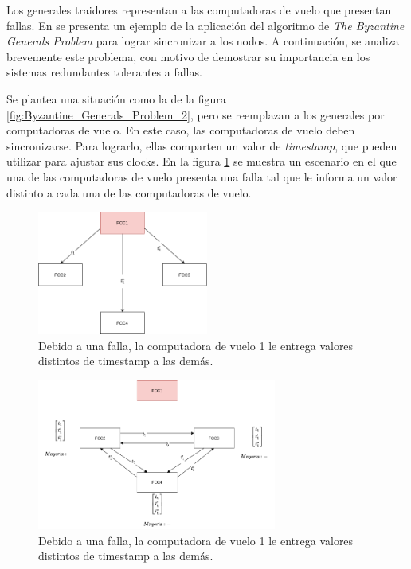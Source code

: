 Los generales traidores representan a las computadoras de vuelo que presentan fallas. En \cite{wensley1978sift} se presenta un ejemplo de la aplicación del algoritmo de \textit{The Byzantine Generals Problem} para lograr sincronizar a los nodos. A continuación, se analiza brevemente este problema, con motivo de demostrar su importancia en los sistemas redundantes tolerantes a fallas.

Se plantea una situación como la de la figura \ref{fig:Byzantine_Generals_Problem_2}, pero se reemplazan a los generales por computadoras de vuelo. En este caso, las computadoras de vuelo deben sincronizarse. Para lograrlo, ellas comparten un valor de \textit{timestamp}, que pueden utilizar para ajustar sus clocks. En la figura \ref{fig:Byzantine_Generals_Problem_5} se muestra un escenario en el que una de las computadoras de vuelo presenta una falla tal que le informa un valor distinto a cada una de las computadoras de vuelo.

\begin{figure}[H]
    \centering
    \includegraphics[width=0.5\textwidth]{img/Byzantine_Generals_Problem_5.png}
    \caption{Debido a una falla, la computadora de vuelo 1 le entrega valores distintos de timestamp a las demás.}
    \label{fig:Byzantine_Generals_Problem_5}
\end{figure}

\begin{figure}[H]
    \centering
    \includegraphics[width=0.7\textwidth]{img/Byzantine_Generals_Problem_6.png}
    \caption{Debido a una falla, la computadora de vuelo 1 le entrega valores distintos de timestamp a las demás.}
    \label{fig:Byzantine_Generals_Problem_6}
\end{figure}

